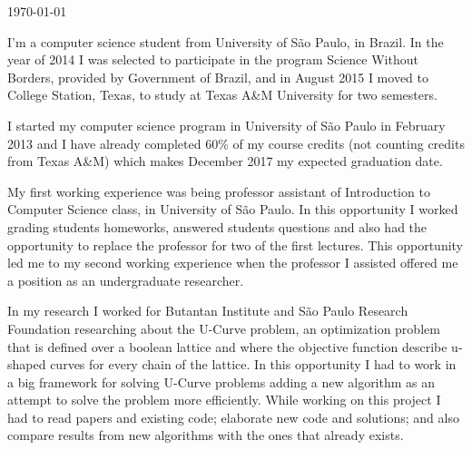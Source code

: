 \documentclass[11pt, a4paper]{awesome-cv}
\begin{document}
\makecvheader

\makecvfooter
  {\today}
  {}
  {}



\begin{cvletter}
\par I'm a computer science student from University of São Paulo, in Brazil. In the year of 2014 I was selected to participate in the program Science Without Borders, provided by Government of Brazil, and in  August 2015 I moved to College Station, Texas, to study at Texas A\&M University for two semesters.
\par I started my computer science program in University of São Paulo in February 2013 and I have already completed 60\% of my course credits (not counting credits from Texas A\&M) which makes December 2017 my expected graduation date.

\par My first working experience  was being professor assistant of Introduction to Computer Science class, in University of São Paulo. In this opportunity I worked grading students homeworks, answered students questions and also had the opportunity to replace the professor for two of the first lectures. This opportunity led me to my second working experience when the professor I assisted offered me a position as an undergraduate researcher.
\par In my research I worked for Butantan Institute and São Paulo Research Foundation researching about the U-Curve problem, an optimization problem that is defined over a boolean lattice and where the objective function describe u-shaped curves for every chain of the lattice. In this opportunity I had to work in a big framework for solving U-Curve problems adding a new algorithm as an attempt to solve the problem more efficiently. While working on this project I had to read papers and existing code; elaborate new code and solutions; and also compare results from new algorithms with the ones that already exists.



\end{cvletter}
\end{document}
